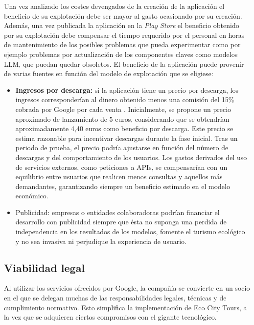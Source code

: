Una vez analizado los costes devengados de la creación de la aplicación el beneficio de su explotación debe ser mayor al gasto ocasionado por su creación. Además, una vez publicada la aplicación en la \textit{Play Store} el beneficio obtenido por su explotación debe compensar el tiempo requerido por el personal en horas de mantenimiento de los posibles problemas que pueda experimentar como por ejemplo problemas por actualización de los componentes claves como modelos LLM, que puedan quedar obsoletos. El beneficio de la aplicación puede provenir de varias fuentes en función del modelo de explotación que se eligiese:
\begin{itemize}
	\item \textbf{Ingresos por descarga:} si la aplicación tiene un precio por descarga, los ingresos corresponderían al dinero obtenido menos una comisión del 15\% cobrada por Google por cada venta \cite{googleplay_commission}. Inicialmente, se propone un precio aproximado de lanzamiento de 5 euros, considerando que se obtendrían aproximadamente 4,40 euros como beneficio por descarga. Este precio se estima razonable para incentivar descargas durante la fase inicial. Tras un periodo de prueba, el precio podría ajustarse en función del número de descargas y del comportamiento de los usuarios. Los gastos derivados del uso de servicios externos, como peticiones a APIs, se compensarían con un equilibrio entre usuarios que realicen menos consultas y aquellos más demandantes, garantizando siempre un beneficio estimado en el modelo económico.
	
	\item{Publicidad:} empresas o entidades colaboradoras podrían financiar el desarrollo con publicidad siempre que ésta no suponga una perdida de independencia en los resultados de los modelos, fomente el turismo ecológico y no sea invasiva ni perjudique la experiencia de usuario.
\end{itemize}

\subsection{Viabilidad legal}
Al utilizar los servicios ofrecidos por Google, la compañía se convierte en un socio en el que se delegan muchas de las responsabilidades legales, técnicas y de cumplimiento normativo. Esto simplifica la implementación de Eco City Tours, a la vez que se adquieren ciertos compromisos con el gigante tecnológico. 


